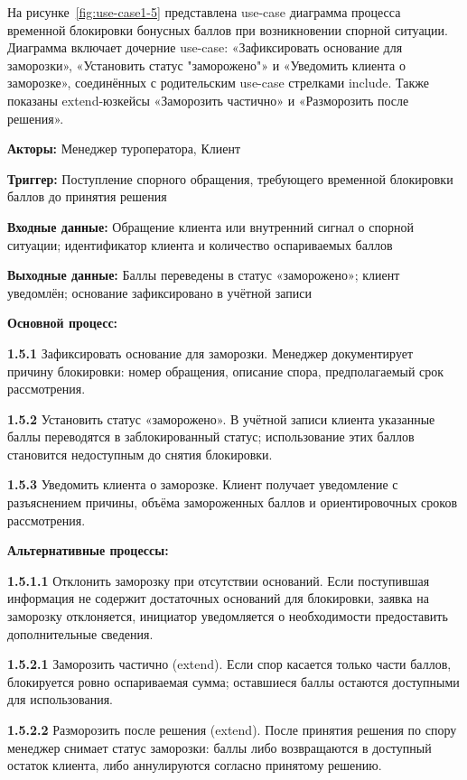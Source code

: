 \documentclass[11pt,a4paper,final]{article}
\begin{document}
На рисунке~\ref{fig:use-case1-5} представлена use-case диаграмма процесса временной блокировки бонусных баллов при возникновении спорной ситуации. Диаграмма включает дочерние use-case: «Зафиксировать основание для заморозки», «Установить статус "заморожено"» и «Уведомить клиента о заморозке», соединённых с родительским use-case стрелками include. Также показаны extend-юзкейсы «Заморозить частично» и «Разморозить после решения».

\textbf{Акторы:} Менеджер туроператора, Клиент

\textbf{Триггер:} Поступление спорного обращения, требующего временной блокировки баллов до принятия решения

\textbf{Входные данные:} Обращение клиента или внутренний сигнал о спорной ситуации; идентификатор клиента и количество оспариваемых баллов

\textbf{Выходные данные:} Баллы переведены в статус «заморожено»; клиент уведомлён; основание зафиксировано в учётной записи

\textbf{Основной процесс:}

\textbf{1.5.1} Зафиксировать основание для заморозки. Менеджер документирует причину блокировки: номер обращения, описание спора, предполагаемый срок рассмотрения.

\textbf{1.5.2} Установить статус «заморожено». В учётной записи клиента указанные баллы переводятся в заблокированный статус; использование этих баллов становится недоступным до снятия блокировки.

\textbf{1.5.3} Уведомить клиента о заморозке. Клиент получает уведомление с разъяснением причины, объёма замороженных баллов и ориентировочных сроков рассмотрения.

\textbf{Альтернативные процессы:}

\textbf{1.5.1.1} Отклонить заморозку при отсутствии оснований. Если поступившая информация не содержит достаточных оснований для блокировки, заявка на заморозку отклоняется, инициатор уведомляется о необходимости предоставить дополнительные сведения.

\textbf{1.5.2.1} Заморозить частично (extend). Если спор касается только части баллов, блокируется ровно оспариваемая сумма; оставшиеся баллы остаются доступными для использования.

\textbf{1.5.2.2} Разморозить после решения (extend). После принятия решения по спору менеджер снимает статус заморозки: баллы либо возвращаются в доступный остаток клиента, либо аннулируются согласно принятому решению.
\end{document}

